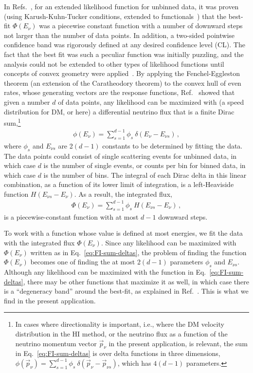 \documentclass[a4paper,11pt]{article}
\renewcommand\({\left(}
\renewcommand\){\right)}
\renewcommand\[{\left[}
\renewcommand\]{\right]}
\newcommand{\al}[1]{\begin{align}#1\end{align}}
\theoremstyle{definition}
\begin{document}
In Refs.~\cite{Fox:2014kua, Gelmini:2015voa}, for an extended likelihood function for unbinned data, it was proven (using Karush-Kuhn-Tucker conditions, extended to functionals~\cite{Gelmini:2015voa}) that the best-fit ${\Phi(E_\nu)}$ was  a piecewise constant function with a number of downward steps not larger than the number of data points. In addition, a two-sided pointwise confidence band was rigorously defined at any desired confidence level (CL).  The fact that the best fit was such a peculiar function was initially puzzling, and the analysis could not be extended to other types of likelihood functions until concepts of convex geometry were applied~\cite{Gelmini:2017aqe}. By applying the Fenchel-Eggleston theorem (an extension of the
Caratheodory theorem) to the convex hull of even rates, whose generating vectors are the response functions,
Ref.~\cite{Gelmini:2017aqe} showed that given a number $d$ of data points, any likelihood can be maximized with (a speed distribution for DM, or here) a differential neutrino flux that is a finite Dirac sum,\footnote{In cases where directionality is important, i.e., where the DM  velocity distribution in the HI method, or the neutrino flux as a function of the neutrino momentum vector $\vec{p}_\nu$ in the present application, is relevant, the sum in Eq.~\eqref{eq:FI-sum-deltas} is over delta functions in three dimensions,  ${\phi(\vec{p}_\nu)} = \sum_{s=1}^{d-1} \phi_s~ \delta(\vec{p}_\nu-\vec{p}_{\nu s})$, which has $4(d-1)$ parameters.}  
   \al{
    {\phi(E_\nu)} = \sum_{s=1}^{d-1} \phi_s~ \delta(E_\nu-E_{\nu s})\,,
\label{eq:FI-sum-deltas}
}
  where $\phi_s$ and $E_{\nu s}$ are 2$(d-1)$ constants to be determined by fitting the data. The data points could consist of single scattering events for unbinned data, in which case $d$ is the number of single events,  or counts per bin for binned data, in which case $d$ is the number of bins.  The integral of each Dirac delta in this linear combination, as a function of its lower limit of integration,  is a left-Heaviside function $H(E_{\nu s}-E_\nu)$. As a result, the integrated flux, 
   \al{
    {\Phi(E_\nu)} = \sum_{s=1}^{d-1} \phi_s~ H(E_{\nu s}-E_\nu) \,,
\label{eq:FI-sum-deltas}
}
is a piecewise-constant function with at most $d-1$ downward steps.

To work with a function whose value is defined at most energies, we fit the data with the integrated flux $\Phi(E_\nu)$.
   Since any likelihood can be maximized with $\Phi(E_\nu)$ written as in Eq.~\eqref{eq:FI-sum-deltas}, the problem of finding the function $\Phi(E_\nu)$ becomes one of finding the at most 2$(d-1)$ parameters $\phi_s$ and $E_{\nu s}$.
Although any likelihood can be maximized with the function in Eq.~\eqref{eq:FI-sum-deltas},  there may be other functions that maximize it as well, in which case there is a ``degeneracy band'' around the best-fit, as explained in Ref.~\cite{Gelmini:2017aqe}.
This is what we find in the present application.  
\end{document}
